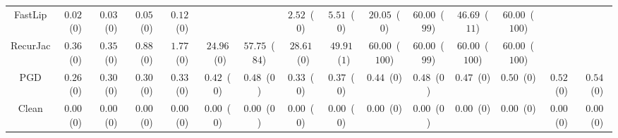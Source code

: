 \begin{table*}
{\begin{tabular}{c|c|c|c|c|c|c|c|c|c|c|c|c|c|c}
      FastLip &  $0.02$~($0$) &  $0.03$~($0$) &  $0.05$~($0$) &  $0.12$~($0$) &               &               &  $2.52$~($0$) &  $5.51$~($0$) & $20.05$~($0$) & $60.00$~($99$) & $46.69$~($11$) & $60.00$~($100$) &               &               \\
     RecurJac &  $0.36$~($0$) &  $0.35$~($0$) &  $0.88$~($0$) &  $1.77$~($0$) & $24.96$~($0$) & $57.75$~($84$) & $28.61$~($0$) & $49.91$~($1$) & $60.00$~($100$) & $60.00$~($99$) & $60.00$~($100$) & $60.00$~($100$) &               &               \\
\hline
          PGD &  $0.26$~($0$) &  $0.30$~($0$) &  $0.30$~($0$) &  $0.33$~($0$) &  $0.42$~($0$) &  $0.48$~($0$) &  $0.33$~($0$) &  $0.37$~($0$) &  $0.44$~($0$) &  $0.48$~($0$) &  $0.47$~($0$) &  $0.50$~($0$) &  $0.52$~($0$) &  $0.54$~($0$) \\
\hline
        Clean &  $0.00$~($0$) &  $0.00$~($0$) &  $0.00$~($0$) &  $0.00$~($0$) &  $0.00$~($0$) &  $0.00$~($0$) &  $0.00$~($0$) &  $0.00$~($0$) &  $0.00$~($0$) &  $0.00$~($0$) &  $0.00$~($0$) &  $0.00$~($0$) &  $0.00$~($0$) &  $0.00$~($0$) \\

    \bottomrule
    \end{tabular}
    }
    \label{table:exp-A-robust-accuracy-time-mnist-1}
\end{table*}
        

